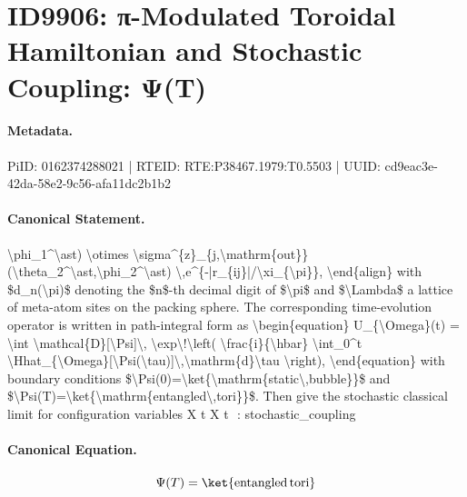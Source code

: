 \section*{ID9906: π-Modulated Toroidal Hamiltonian and Stochastic Coupling: Ψ(T)}
\paragraph{Metadata.}
PiID: 0162374288021 | RTEID: RTE:P38467.1979:T0.5503 | UUID: cd9eac3e-42da-58e2-9c56-afa11dc2b1b2

\paragraph{Canonical Statement.}
\textbackslash{}phi\_1\textasciicircum{}\textbackslash{}ast) \textbackslash{}otimes \textbackslash{}sigma\textasciicircum{}\{z\}\_\{j,\textbackslash{}mathrm\{out\}\}(\textbackslash{}theta\_2\textasciicircum{}\textbackslash{}ast,\textbackslash{}phi\_2\textasciicircum{}\textbackslash{}ast) \textbackslash{},e\textasciicircum{}\{-|r\_\{ij\}|/\textbackslash{}xi\_\{\textbackslash{}pi\}\}, \textbackslash{}end\{align\} with \$d\_n(\textbackslash{}pi)\$ denoting the \$n\$-th decimal digit of \$\textbackslash{}pi\$ and \$\textbackslash{}Lambda\$ a lattice of meta-atom sites on the packing sphere. The corresponding time-evolution operator is written in path-integral form as \textbackslash{}begin\{equation\} U\_\{\textbackslash{}Omega\}(t) = \textbackslash{}int \textbackslash{}mathcal\{D\}[\textbackslash{}Psi]\textbackslash{}, \textbackslash{}exp\textbackslash{}!\textbackslash{}left( \textbackslash{}frac\{i\}\{\textbackslash{}hbar\} \textbackslash{}int\_0\textasciicircum{}t \textbackslash{}Hhat\_\{\textbackslash{}Omega\}[\textbackslash{}Psi(\textbackslash{}tau)]\textbackslash{},\textbackslash{}mathrm\{d\}\textbackslash{}tau \textbackslash{}right), \textbackslash{}end\{equation\} with boundary conditions \$\textbackslash{}Psi(0)=\textbackslash{}ket\{\textbackslash{}mathrm\{static\textbackslash{},bubble\}\}\$ and \$\textbackslash{}Psi(T)=\textbackslash{}ket\{\textbackslash{}mathrm\{entangled\textbackslash{},tori\}\}\$. Then give the stochastic classical limit for configuration variables X t X t ​ : stochastic\_coupling

\paragraph{Canonical Equation.}
\[
\Psi(T)=\ket{\mathrm{entangled\,tori}}
\]

